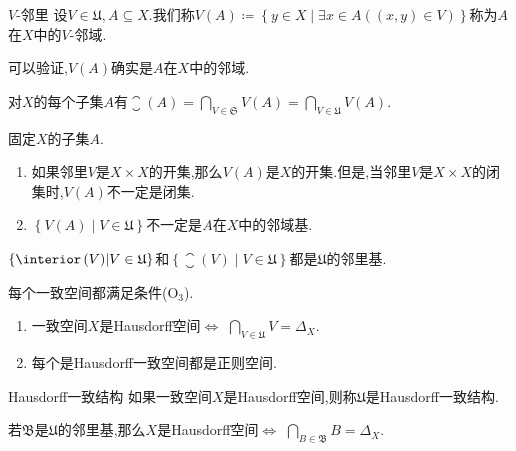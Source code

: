 \begin{definition}{$V$-邻里}{}
	设$V\in\mathfrak{U},A\subseteq X$.我们称$V\left(A\right)\coloneq\left\{y\in X\middle|\exists x\in A\left(\left(x,y\right)\in V\right)\right\}$称为$A$在$X$中的$V$-邻域.
\end{definition}

\begin{remark}{}{}
	可以验证,$V\left(A\right)$确实是$A$在$X$中的邻域.
\end{remark}

\begin{proposition}{}{}
	对$X$的每个子集$A$有$\closure\left(A\right)=\bigcap\limits_{V\in\mathfrak{S}}V\left(A\right)=\bigcap\limits_{V\in\mathfrak{U}}V\left(A\right)$.
\end{proposition}

\begin{remark}{}{}
	固定$X$的子集$A$.
	\begin{enumerate}
		\item 如果邻里$V$是$X\times X$的开集,那么$V\left(A\right)$是$X$的开集.但是,当邻里$V$是$X\times X$的闭集时,$V\left(A\right)$不一定是闭集.
		\item $\left\{V\left(A\right)\middle|V\in\mathfrak{U}\right\}$不一定是$A$在$X$中的邻域基.
	\end{enumerate}
\end{remark}

\begin{corollary}{}{}
	$\left\{\interior\left(V\right)\middle|V\in\mathfrak{U}\right\}$和$\left\{\closure\left(V\right)\middle|V\in\mathfrak{U}\right\}$都是$\mathfrak{U}$的邻里基.
\end{corollary}

\begin{corollary}{}{}
	每个一致空间都满足条件($\mathrm{O}_{3}$).
\end{corollary}

\begin{proposition}{}{}
	\begin{enumerate}
		\item 一致空间$X$是Hausdorff空间$\iff$ $\bigcap\limits_{V\in\mathfrak{U}}V=\Delta_{X}$.
		\item 每个是Hausdorff一致空间都是正则空间.
	\end{enumerate}
\end{proposition}

\begin{definition}{Hausdorff一致结构}{}
	如果一致空间$X$是Hausdorff空间,则称$\mathfrak{U}$是Hausdorff一致结构.
\end{definition}

\begin{remark}{}{}
	若$\mathfrak{B}$是$\mathfrak{U}$的邻里基,那么$X$是Hausdorff空间$\iff$ $\bigcap\limits_{B\in\mathfrak{B}}B=\Delta_{X}$.
\end{remark}